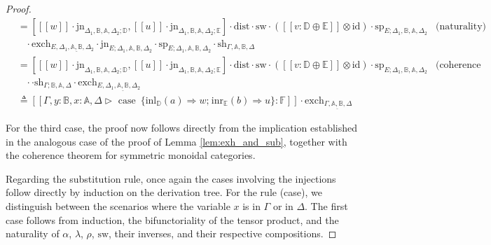 \documentclass[10pt,a4paper]{amsart}
\theoremstyle{definition}
\theoremstyle{definition}
\theoremstyle{definition}
\theoremstyle{definition}
\theoremstyle{definition}
\theoremstyle{definition}
\begin{document}
\begin{proof}
\begin{align*}
  & = [[\![ w ]\!] \cdot \text{jn}_{\Delta_{1} ,\mathbb{B},\mathbb{A},  \Delta_{2};\mathbb{D}},  [\![u ]\!] \cdot \text{jn}_{\Delta_{1} ,\mathbb{B},\mathbb{A},  \Delta_{2};\mathbb{E}}] \cdot \text{dist} \cdot \text{sw} \cdot ([\![  v : \mathbb{D} \oplus \mathbb{E}  ]\!] \otimes \text{id}) \cdot \text{sp}_{E;\Delta_{1}, \mathbb{B}, \mathbb{A}, \Delta_{2}} & {\text{(naturality)}} \\
  & \hspace{10pt}  \cdot  \text{exch}_{E, \Delta_{1},\underline{\mathbb{A},\mathbb{B}},  \Delta_{2}} \cdot  \text{jn}_{E ;\Delta_{1},\mathbb{A},\mathbb{B},  \Delta_{2}}   \cdot\text{sp}_{E; \Delta_{1},\mathbb{A},\mathbb{B},  \Delta_{2}} \cdot \text{sh}_{\Gamma,\mathbb{A}, \mathbb{B},\Delta} \\
  & = [[\![ w ]\!] \cdot \text{jn}_{\Delta_{1} ,\mathbb{B},\mathbb{A},  \Delta_{2};\mathbb{D}},  [\![u ]\!] \cdot \text{jn}_{\Delta_{1} ,\mathbb{B},\mathbb{A},  \Delta_{2};\mathbb{E}}] \cdot \text{dist} \cdot \text{sw} \cdot ([\![  v : \mathbb{D} \oplus \mathbb{E}  ]\!] \otimes \text{id}) \cdot \text{sp}_{E; \Delta_{1}, \mathbb{B},\mathbb{A},  \Delta_{2}} & {\text{(coherence theorem)}} \\
  & \hspace{10pt} \cdot \cdot \text{sh}_{\Gamma; \mathbb{B},\mathbb{A}, \Delta} \cdot  \text{exch}_{E, \Delta_{1},\underline{\mathbb{A},\mathbb{B}},  \Delta_{2}} \\
  & \triangleq [\![\Gamma,y:\mathbb{B}, x:\mathbb{A}, \Delta \triangleright \text{ case }  \hspace{2pt}  \{\text{inl}_{\mathbb{D}} (a) \Rightarrow w ; \hspace{1pt} \text{inr}_{\mathbb{E}} (b) \Rightarrow u\}: \mathbb{F}]\!] \cdot \text{exch}_{\Gamma,\underline{\mathbb{A},  \mathbb{B}}, \Delta}
\end{align*}

For the third case, the proof now follows directly from the implication established in the analogous case of the proof of Lemma \ref{lem:exh_and_sub}, together with the coherence theorem for symmetric monoidal categories.

Regarding the substitution rule, once again the cases involving the injections follow directly by induction on the derivation tree. For the rule (case), we distinguish between the scenarios where the variable $x$ is in $\Gamma$ or in $\Delta$. The first case follows from induction, the bifunctoriality of the tensor product, and the naturality of $\alpha$, $\lambda$, $\rho$, $\text{sw}$, their inverses, and their respective compositions.


\end{proof}
\end{document}

